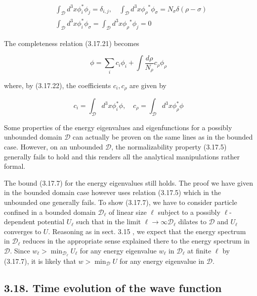 \documentclass{article}
\begin{document}
\begin{align*}
& \int_{\mathcal{D}} d^{3} x \phi_{i}^{*} \phi_{j}=\delta_{i, j}, \quad \int_{\mathcal{D}} d^{3} x \phi_{\rho}{ }^{*} \phi_{\sigma}=N_{\sigma} \delta(\rho-\sigma)  \tag{3.17.30}\\
& \int_{\mathcal{D}} d^{3} x \phi_{i}^{*} \phi_{\sigma}=\int_{\mathcal{D}} d^{3} x \phi_{\rho}{ }^{*} \phi_{j}=0
\end{align*}
 

The completeness relation (3.17.21) becomes
 
\begin{equation*}
\phi=\sum_{i} c_{i} \phi_{i}+\int \frac{d \rho}{N_{\rho}} c_{\rho} \phi_{\rho} \tag{3.17.31}
\end{equation*}
 
where, by (3.17.22), the coefficients $c_{i}, c_{\rho}$ are given by
 
\begin{equation*}
c_{i}=\int_{\mathcal{D}} d^{3} x \phi_{i}^{*} \phi, \quad c_{\rho}=\int_{\mathcal{D}} d^{3} x \phi_{\rho}^{*} \phi \tag{3.17.32}
\end{equation*}
 

Some properties of the energy eigenvalues and eigenfunctions for a possibly
unbounded domain $\mathcal{D}$ can actually be proven on the same lines as in the bounded case. However, on an unbounded $\mathcal{D}$, the normalizability property (3.17.5) generally fails to hold and this renders all the analytical manipulations rather formal.

The bound (3.17.7) for the energy eigenvalues still holds. The proof we have given in the bounded domain case however uses relation (3.17.5) which in the unbounded one generally fails. To show (3.17.7), we have to consider particle confined in a bounded domain $\mathcal{D}_{\ell}$ of linear size $\ell$ subject to a possibly $\ell$-dependent potential $U_{\ell}$ such that in the limit $\ell \rightarrow \infty \mathcal{D}_{\ell}$ dilates to $\mathcal{D}$ and $U_{\ell}$ converges to $U$. Reasoning as in sect. 3.15 , we expect that the energy spectrum in $\mathcal{D}_{\ell}$ reduces in the appropriate sense explained there to the energy spectrum in $\mathcal{D}$. Since $w_{\ell}>\min _{\mathcal{D}_{\ell}} U_{\ell}$ for any energy eigenvalue $w_{\ell}$ in $\mathcal{D}_{\ell}$ at finite $\ell$ by (3.17.7), it is likely that $w>\min _{\mathcal{D}} U$ for any energy eigenvalue in $\mathcal{D}$.

\subsection*{3.18. Time evolution of the wave function}
\end{document}
